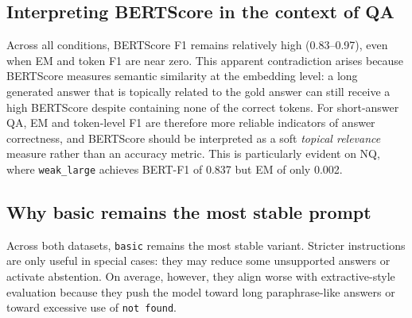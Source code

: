 \documentclass[a4paper,12pt]{article}
\begin{document}
\subsection{Interpreting BERTScore in the context of QA}
Across all conditions, BERTScore F1 remains relatively high (0.83--0.97), even when EM and token F1 are near zero. This apparent contradiction arises because BERTScore measures semantic similarity at the embedding level: a long generated answer that is topically related to the gold answer can still receive a high BERTScore despite containing none of the correct tokens. For short-answer QA, EM and token-level F1 are therefore more reliable indicators of answer correctness, and BERTScore should be interpreted as a soft \emph{topical relevance} measure rather than an accuracy metric. This is particularly evident on NQ, where \texttt{weak\_large} achieves BERT-F1 of 0.837 but EM of only 0.002.

\subsection{Why basic remains the most stable prompt}
Across both datasets, \texttt{basic} remains the most stable variant. Stricter instructions are only useful in special cases: they may reduce some unsupported answers or activate abstention. On average, however, they align worse with extractive-style evaluation because they push the model toward long paraphrase-like answers or toward excessive use of \texttt{not found}.
\end{document}
